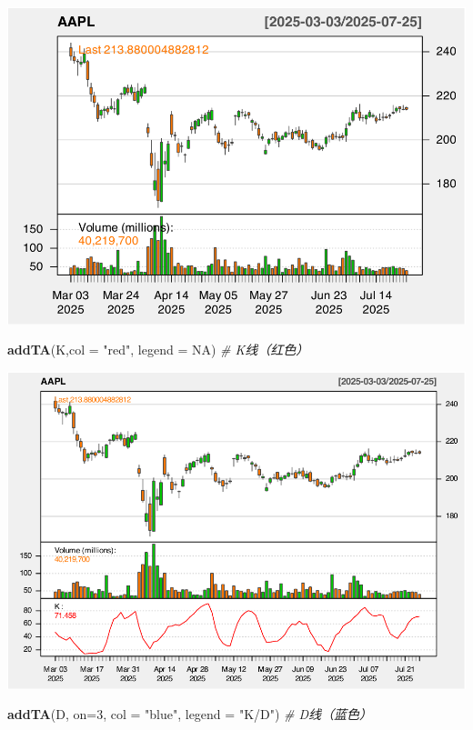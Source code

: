 \documentclass[]{ctexbook}
\newenvironment{Shaded}{\begin{snugshade}}{\end{snugshade}}
\newcommand{\AttributeTok}[1]{\textcolor[rgb]{0.13,0.29,0.53}{#1}}
\newcommand{\CommentTok}[1]{\textcolor[rgb]{0.56,0.35,0.01}{\textit{#1}}}
\newcommand{\ConstantTok}[1]{\textcolor[rgb]{0.56,0.35,0.01}{#1}}
\newcommand{\DecValTok}[1]{\textcolor[rgb]{0.00,0.00,0.81}{#1}}
\newcommand{\FunctionTok}[1]{\textcolor[rgb]{0.13,0.29,0.53}{\textbf{#1}}}
\newcommand{\NormalTok}[1]{#1}
\newcommand{\StringTok}[1]{\textcolor[rgb]{0.31,0.60,0.02}{#1}}
\begin{document}
\includegraphics[width=0.9\linewidth]{QuantmodHandbook_files/figure-latex/kdj-1}

\begin{Shaded}
\begin{Highlighting}[]
\FunctionTok{addTA}\NormalTok{(K,}\AttributeTok{col =} \StringTok{"red"}\NormalTok{, }\AttributeTok{legend =} \ConstantTok{NA}\NormalTok{)    }\CommentTok{\# K线（红色）}
\end{Highlighting}
\end{Shaded}

\includegraphics[width=0.9\linewidth]{QuantmodHandbook_files/figure-latex/kdj-2}

\begin{Shaded}
\begin{Highlighting}[]
\FunctionTok{addTA}\NormalTok{(D, }\AttributeTok{on=}\DecValTok{3}\NormalTok{, }\AttributeTok{col =} \StringTok{"blue"}\NormalTok{, }\AttributeTok{legend =} \StringTok{"K/D"}\NormalTok{)   }\CommentTok{\# D线（蓝色）}
\end{Highlighting}
\end{Shaded}
\end{document}

